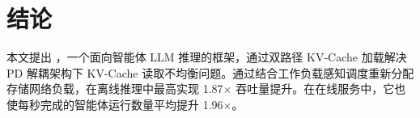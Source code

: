 \section{结论}
\label{sec:conclusion}

本文提出 \sysname，一个面向智能体 LLM 推理的框架，通过双路径 KV-Cache 加载解决 PD 解耦架构下 KV-Cache 读取不均衡问题。通过结合工作负载感知调度重新分配存储网络负载，\sysname 在离线推理中最高实现 1.87$\times$ 吞吐量提升。在在线服务中，它也使每秒完成的智能体运行数量平均提升 1.96$\times$。


